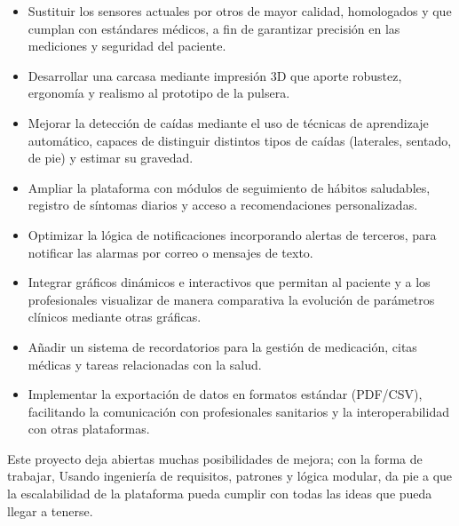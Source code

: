 \documentclass[12pt, a4paper]{article}
\begin{document}
\begin{itemize}
	\item Sustituir los sensores actuales por otros de mayor calidad, homologados y que cumplan con estándares médicos, a fin de garantizar precisión en las mediciones y seguridad del paciente.
	\item Desarrollar una carcasa mediante impresión 3D que aporte robustez, ergonomía y realismo al prototipo de la pulsera.
	\item Mejorar la detección de caídas mediante el uso de técnicas de aprendizaje automático, capaces de distinguir distintos tipos de caídas (laterales, sentado, de pie) y estimar su gravedad.
	\item Ampliar la plataforma con módulos de seguimiento de hábitos saludables, registro de síntomas diarios y acceso a recomendaciones personalizadas.
	\item Optimizar la lógica de notificaciones incorporando alertas de terceros, para notificar las alarmas por correo o mensajes de texto.
	\item Integrar gráficos dinámicos e interactivos que permitan al paciente y a los profesionales visualizar de manera comparativa la evolución de parámetros clínicos mediante otras gráficas.
	\item Añadir un sistema de recordatorios para la gestión de medicación, citas médicas y tareas relacionadas con la salud.
	\item Implementar la exportación de datos en formatos estándar (PDF/CSV), facilitando la comunicación con profesionales sanitarios y la interoperabilidad con otras plataformas.
\end{itemize}

Este proyecto deja abiertas muchas posibilidades de mejora; con la forma de trabajar, Usando ingeniería de requisitos, patrones y lógica modular, da pie a que la escalabilidad de la plataforma pueda cumplir con todas las ideas que pueda llegar a tenerse.
\end{document}
